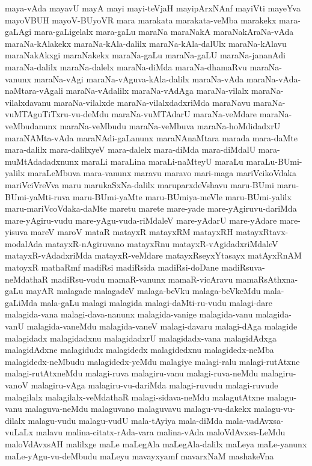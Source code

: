 {maya-vAda
mayavU
mayA
mayi
mayi-teVjaH
mayipArxNAnf
mayiVti
mayeYva
mayoVBUH
mayoV-BUyoVR
mara
marakata
marakata-veMba
marakekx
mara-gaLAgi
mara-gaLigelalx
mara-gaLu
maraNa
maraNakA
maraNakAraNa-vAda
maraNa-kAlakekx
maraNa-kAla-dalilx
maraNa-kAla-dalUlx
maraNa-kAlavu
maraNakAkxgi
maraNakekx
maraNa-gaLu
maraNa-gaLU
maraNa-jananAdi
maraNa-dalilx
maraNa-dalelx
maraNa-diMda
maraNa-dhamaRvu
maraNa-vanunx
maraNa-vAgi
maraNa-vAguva-kAla-dalilx
maraNa-vAda
maraNa-vAda-naMtara-vAgali
maraNa-vAdalilx
maraNa-vAdAga
maraNa-vilalx
maraNa-vilalxdavanu
maraNa-vilalxde
maraNa-vilalxdadxriMda
maraNavu
maraNa-vuMTAguTiTxru-vu-deMdu
maraNa-vuMTAdarU
maraNa-veMdare
maraNa-veMbudanunx
maraNa-veMbudu
maraNa-veMbuva
maraNa-hoMdidadxrU
maraNAMta-vAda
maraNAdi-gaLanunx
maraNAnaMtara
marada
mara-daMte
mara-dalilx
mara-dalilxyeV
mara-dalelx
mara-diMda
mara-diMdalU
mara-muMtAdadadxnunx
maraLi
maraLina
maraLi-naMteyU
maraLu
maraLu-BUmi-yalilx
maraLeMbuva
mara-vanunx
maravu
maravo
mari-maga
mariVcikoVdaka
mariVciVreVva
maru
marukaSxNa-dalilx
maruparxdeVshavu
maru-BUmi
maru-BUmi-yaMti-ruva
maru-BUmi-yaMte
maru-BUmiya-meVle
maru-BUmi-yalilx
maru-mariVcoVdaka-daMte
maretu
marete
mare-yade
mare-yAgiruvu-dariMda
mare-yAgiru-vudu
mare-yAgu-vuda-riMdaleV
mare-yAdarU
mare-yAdare
mare-yisuva
mareV
maroV
mataR
matayxR
matayxRM
matayxRH
matayxRtavx-modalAda
matayxR-nAgiruvano
matayxRnu
matayxR-vAgidadxriMdaleV
matayxR-vAdadxriMda
matayxR-veMdare
matayxRseyxYtasayx
matAyxRnAM
matoyxR
mathaRmf
madiRsi
madiRsida
madiRsi-doDane
madiRsuva-neMdathaR
madiRsu-vudu
mamaR-vanunx
mamaR-vicAravu
mamaRsAthxna-gaLu
mayAR
malagade
malagadeV
malaga-beVku
malaga-beVkeMdu
mala-gaLiMda
mala-gaLu
malagi
malagida
malagi-daMti-ru-vudu
malagi-dare
malagida-vana
malagi-dava-nanunx
malagida-vanige
malagida-vanu
malagida-vanU
malagida-vaneMdu
malagida-vaneV
malagi-davaru
malagi-dAga
malagide
malagidadx
malagidadxnu
malagidadxrU
malagidadx-vana
malagidAdxga
malagidAdxne
malagidudx
malagidedx
malagidedxnu
malagidedx-neMba
malagidedx-neMbudu
malagidedx-yeMdu
malagiye
malagi-ralu
malagi-rutAtxne
malagi-rutAtxneMdu
malagi-ruva
malagiru-vanu
malagi-ruva-neMdu
malagiru-vanoV
malagiru-vAga
malagiru-vu-dariMda
malagi-ruvudu
malagi-ruvude
malagilalx
malagilalx-veMdathaR
malagi-sidava-neMdu
malagutAtxne
malagu-vanu
malaguva-neMdu
malaguvano
malaguvavu
malagu-vu-dakekx
malagu-vu-dilalx
malagu-vudu
malagu-vudU
mala-tAyiya
mala-diMda
mala-vadAvxsa-vuLaLx
malavu
malina-citatx-rAda-vara
malina-vAda
maloVdAvxsa-LeMdu
maloVdAvxsAH
malilxge
maLe
maLegAla
maLegAla-dalilx
maLeya
maLe-yanunx
maLe-yAgu-vu-deMbudu
maLeyu
mavayxyamf
mavarxNaM
mashakeVna
}
